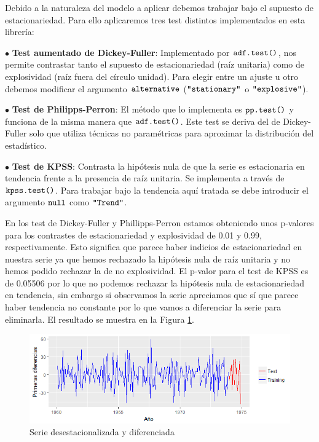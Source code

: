 Debido a la naturaleza del modelo a aplicar debemos trabajar bajo el supuesto de estacionariedad. Para ello aplicaremos tres test distintos implementados en esta librería:
\begin{itemize*}
  \item[$\bullet$] \textbf{Test aumentado de Dickey-Fuller}: Implementado por $\verb!adf.test()!$, nos permite contrastar tanto el supuesto de estacionariedad (raíz unitaria) como de explosividad (raíz fuera del círculo unidad). Para elegir entre un ajuste u otro debemos modificar el argumento $\verb!alternative!$ ($\verb!"stationary"!$ o $\verb!"explosive"!$).
  \item[$\bullet$] \textbf{Test de Philipps-Perron}: El método que lo implementa es $\verb!pp.test()!$ y funciona de la misma manera que $\verb!adf.test()!$. Este test se deriva del de Dickey-Fuller solo que utiliza técnicas no paramétricas para aproximar la distribución del estadístico.
  \item[$\bullet$] \textbf{Test de KPSS}: Contrasta la hipótesis nula de que la serie es estacionaria en tendencia frente a la presencia de raíz unitaria. Se implementa a través de $\verb!kpss.test()!$. Para trabajar bajo la tendencia aquí tratada se debe introducir el argumento $\verb!null!$ como $\verb!"Trend"!$.
\end{itemize*}

En los test de Dickey-Fuller y Phillipps-Perron estamos obteniendo unos p-valores para los contrastes de estacionariedad y explosividad de 0.01 y 0.99, respectivamente.  Esto significa que parece haber indicios de estacionariedad en nuestra serie ya que hemos rechazado la hipótesis nula de raíz unitaria y no hemos podido rechazar la de no explosividad. El p-valor para el test de KPSS es de 0.05506 por lo que no podemos rechazar la hipótesis nula de estacionariedad en tendencia, sin embargo si observamos la serie apreciamos que sí que parece haber tendencia no constante por lo que vamos a diferenciar la serie para eliminarla. El resultado se muestra en la Figura \ref{acc_deses_diff}.
\begin{figure}
    \centering
    \centerline{\includegraphics[scale = 0.7]{Images/Modelizacion/323.png}}
    \caption{Serie  desestacionalizada y diferenciada}
    \label{acc_deses_diff}
\end{figure}

